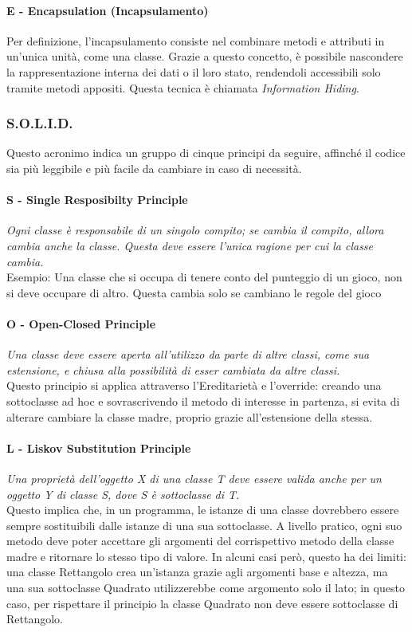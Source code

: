 \documentclass{article}
\begin{document}
            \paragraph{E - Encapsulation (Incapsulamento)} Per definizione, l'incapsulamento consiste nel combinare metodi e attributi in un'unica unità, come una classe. Grazie a questo concetto, è possibile nascondere la rappresentazione interna dei dati o il loro stato, rendendoli accessibili solo tramite metodi appositi. Questa tecnica è chiamata \textit{Information Hiding}.
            
        \subsubsection{S.O.L.I.D.}
            Questo acronimo indica un gruppo di cinque principi da seguire, affinché il codice sia più leggibile e più facile da cambiare in caso di necessità.
            \paragraph{S - Single Resposibilty Principle} \textit{Ogni classe è responsabile di un singolo compito; se cambia il compito, allora cambia anche la classe. Questa deve essere l'unica ragione per cui la classe cambia.}\\
            Esempio: Una classe che si occupa di tenere conto del punteggio di un gioco, non si deve occupare di altro. Questa cambia solo se cambiano le regole del gioco
            \paragraph{O - Open-Closed Principle} \textit{Una classe deve essere aperta all'utilizzo da parte di altre classi, come sua estensione, e chiusa alla possibilità di esser cambiata da altre classi.}\\
            Questo principio si applica attraverso l'Ereditarietà e l'override: creando una sottoclasse ad hoc e sovrascrivendo il metodo di interesse in partenza, si evita di alterare cambiare la classe madre, proprio grazie all'estensione della stessa.
            \paragraph{L - Liskov Substitution Principle} \textit{Una proprietà dell'oggetto X di una classe T deve essere valida anche per un oggetto Y di classe S, dove S è sottoclasse di T.}\\
            Questo implica che, in un programma, le istanze di una classe dovrebbero essere sempre sostituibili dalle istanze di una sua sottoclasse. A livello pratico, ogni suo metodo deve poter accettare gli argomenti del corrispettivo metodo della classe madre e ritornare lo stesso tipo di valore. In alcuni casi però, questo ha dei limiti: una classe Rettangolo crea un'istanza grazie agli argomenti base e altezza, ma una sua sottoclasse Quadrato utilizzerebbe come argomento solo il lato; in questo caso, per rispettare il principio la classe Quadrato non deve essere sottoclasse di Rettangolo.
\end{document}
